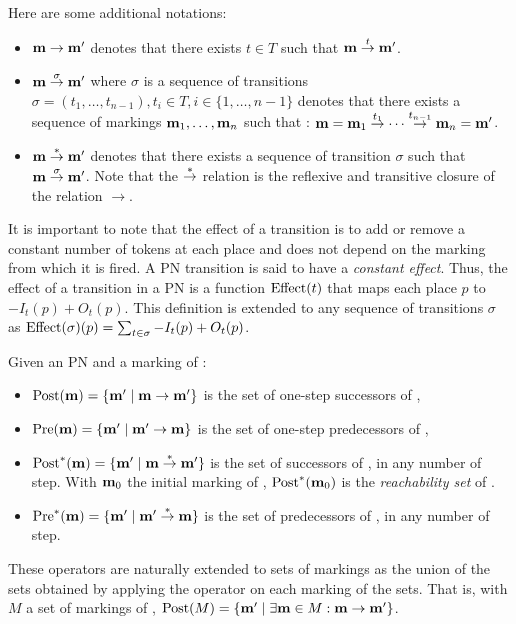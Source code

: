 Here are some additional notations:
\begin{itemize}
  \item $\mathbf{m} \rightarrow \mathbf{m'}$ denotes that there exists $t \in T$ such that $\mathbf{m} \stackrel{t}{\to} \mathbf{m'}$.
  \item $\mathbf{m} \stackrel{\sigma}{\to} \mathbf{m'}$ where $\sigma$ is a sequence of transitions $\sigma = (t_1, \dots, t_{n-1}), t_i \in T, i \in \{1, \dots, n-1\}$ denotes that there exists a sequence of markings $\mathbf{m}_1, \dots, \mathbf{m}_n$ such that : $\mathbf{m} = \mathbf{m}_1 \stackrel{t_1}{\to} \cdots \stackrel{t_{n-1}}{\to} \mathbf{m}_n = \mathbf{m'}$.
  \item $\mathbf{m} \stackrel{*}{\to} \mathbf{m'}$ denotes that there exists a sequence of transition $\sigma$ such that $\mathbf{m} \stackrel{\sigma}{\to} \mathbf{m'}$.
    Note that the $\stackrel{*}{\to}$ relation is the reflexive and transitive closure of the relation $\rightarrow$.
\end{itemize}

It is important to note that the effect of a transition is to add or remove a constant number of tokens at each place and does not depend on the marking from which it is fired.
A \ac{PN} transition is said to have a \emph{constant effect}.
Thus, the effect of a transition in a \ac{PN} is a function $\operatorname{Effect}(t)$ that maps each place $p$ to $-I_t(p) + O_t(p)$.
This definition is extended to any sequence of transitions $\sigma$ as $\operatorname{Effect}(\sigma)(p) = \sum_{t \in \sigma} -I_t(p) + O_t(p)$.

\begin{defi}
  Given an \ac{PN} \NPT and a marking \mar of \N:
  \begin{itemize}
    \item $\operatorname{Post}(\mathbf{m}) = \{\mathbf{m'} \mid \mathbf{m} \rightarrow \mathbf{m'}\}$ is the set of one-step successors of \mar,
    \item $\operatorname{Pre}(\mathbf{m}) = \{\mathbf{m'} \mid \mathbf{m'} \rightarrow \mathbf{m}\}$ is the set of one-step predecessors of \mar,
    \item $\operatorname{Post}^*(\mathbf{m}) = \{\mathbf{m'} \mid \mathbf{m} \stackrel{*}{\to} \mathbf{m'}\}$ is the set of successors of \mar, in any number of step.
      With $\mathbf{m}_0$ the initial marking of \N, $\operatorname{Post}^*(\mathbf{m}_0)$ is the \emph{reachability set} of \N.
    \item $\operatorname{Pre}^*(\mathbf{m}) = \{\mathbf{m'} \mid \mathbf{m'} \stackrel{*}{\to} \mathbf{m}\}$ is the set of predecessors of \mar, in any number of step.
  \end{itemize}
\end{defi}

These operators are naturally extended to sets of markings as the union of the sets obtained by applying the operator on each marking of the sets.
That is, with $M$ a set of markings of \N,
$\operatorname{Post}(M) = \{\mathbf{m'} \mid \exists \mathbf{m} \in M : \mathbf{m} \rightarrow \mathbf{m'}\}$.

